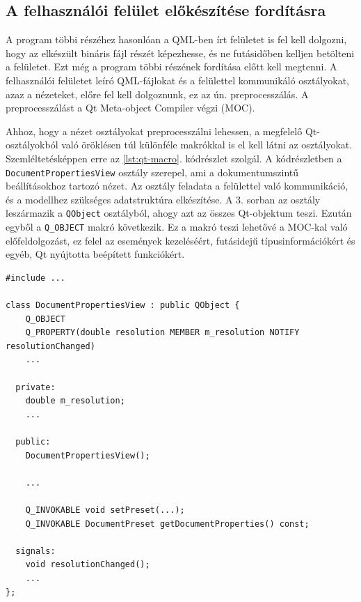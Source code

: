 \subsection{A felhasználói felület előkészítése fordításra}

A program többi részéhez hasonlóan a QML-ben írt felületet is fel kell dolgozni, hogy az elkészült bináris fájl részét képezhesse, és ne futásidőben kelljen betölteni a felületet. Ezt még a program többi részének fordítása előtt kell megtenni. A felhasználói felületet leíró QML-fájlokat és a felülettel kommunikáló osztályokat, azaz a nézeteket, előre fel kell dolgoznunk, ez az ún. preprocesszálás.
A preprocesszálást a Qt Meta-object Compiler végzi (MOC).

Ahhoz, hogy a nézet osztályokat preprocesszálni lehessen, a megfelelő Qt-osztályokból való öröklésen túl különféle makrókkal is el kell látni az osztályokat. Szemléltetésképpen erre az \ref{lst:qt-macro}. kódrészlet szolgál. A kódrészletben a \texttt{DocumentPropertiesView} osztály szerepel, ami a dokumentumszintű beállításokhoz tartozó nézet. Az osztály feladata a felülettel való kommunikáció, és a modellhez szükséges adatstruktúra elkészítése. A 3. sorban az osztály leszármazik a \texttt{QObject} osztályból, ahogy azt az összes Qt-objektum teszi. Ezután egyből a \texttt{Q\_OBJECT} makró következik. Ez a makró teszi lehetővé a MOC-kal való előfeldolgozást, ez felel az események kezeléséért, futásidejű típusinformációkért és egyéb, Qt nyújtotta beépített funkciókért. 

\begin{listing}[!h]
    \caption{Példa egy saját \texttt{QObject} osztály deklarálására.}
    \label{lst:qt-macro}
    \begin{verbatim}
#include ...

class DocumentPropertiesView : public QObject {
    Q_OBJECT
    Q_PROPERTY(double resolution MEMBER m_resolution NOTIFY resolutionChanged)
    ...

  private:
    double m_resolution;
    ...

  public:
    DocumentPropertiesView();
    
    ...

    Q_INVOKABLE void setPreset(...);
    Q_INVOKABLE DocumentPreset getDocumentProperties() const;

  signals:
    void resolutionChanged();
    ...
};
    \end{verbatim}
\end{listing}


